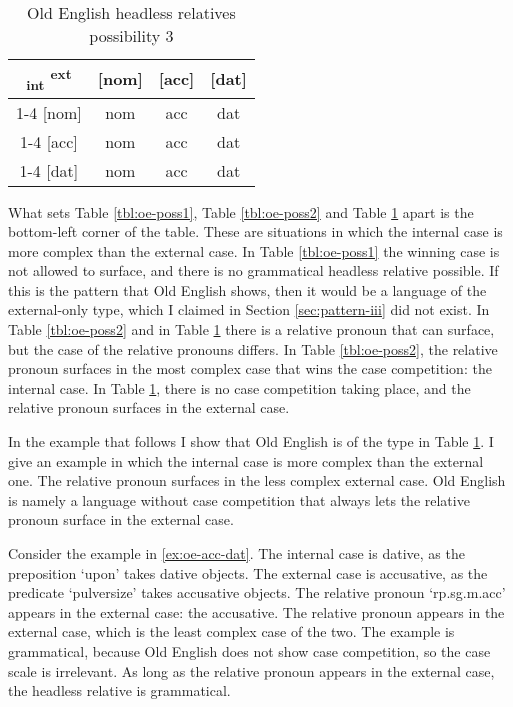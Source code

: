  \begin{table}[ht]
   \center
   \caption{Old English headless relatives possibility 3}
   \begin{tabular}{c|c|c|c}
     \toprule
    \textsubscript{\ac{int}} \textsuperscript{\ac{ext}}
           & [\ac{nom}]
           & [\ac{acc}]
           & [\ac{dat}]
           \\ \cmidrule{1-4}
       [\ac{nom}]
           & \ac{nom}
           & \ac{acc}
           & \cellcolor{LG}\ac{dat}
           \\ \cmidrule{1-4}
       [\ac{acc}]
           & \ac{nom}
           & \ac{acc}
           & \ac{dat}
           \\ \cmidrule{1-4}
       [\ac{dat}]
           & \ac{nom}
           & \ac{acc}
           & \ac{dat}
           \\
     \bottomrule
   \end{tabular}
   \label{tbl:oe-poss3}
 \end{table}

What sets Table \ref{tbl:oe-poss1}, Table \ref{tbl:oe-poss2} and Table \ref{tbl:oe-poss3} apart is the bottom-left corner of the table. These are situations in which the internal case is more complex than the external case.
In Table \ref{tbl:oe-poss1} the winning case is not allowed to surface, and there is no grammatical headless relative possible. If this is the pattern that Old English shows, then it would be a language of the external-only type, which I claimed in Section \ref{sec:pattern-iii} did not exist.
In Table \ref{tbl:oe-poss2} and in Table \ref{tbl:oe-poss3} there is a relative pronoun that can surface, but the case of the relative pronouns differs. In Table \ref{tbl:oe-poss2}, the relative pronoun surfaces in the most complex case that wins the case competition: the internal case. In Table \ref{tbl:oe-poss3}, there is no case competition taking place, and the relative pronoun surfaces in the external case.

In the example that follows I show that Old English is of the type in Table \ref{tbl:oe-poss3}. I give an example in which the internal case is more complex than the external one. The relative pronoun surfaces in the less complex external case. Old English is namely a language without case competition that always lets the relative pronoun surface in the external case.

Consider the example in \ref{ex:oe-acc-dat}.
The internal case is dative, as the preposition  `upon' takes dative objects.
The external case is accusative, as the predicate  `pulversize' takes accusative objects.
The relative pronoun  `\ac{rp}.\ac{sg}.\ac{m}.\ac{acc}' appears in the external case: the accusative.
The relative pronoun appears in the external case, which is the least complex case of the two. The example is grammatical, because Old English does not show case competition, so the case scale is irrelevant. As long as the relative pronoun appears in the external case, the headless relative is grammatical.

